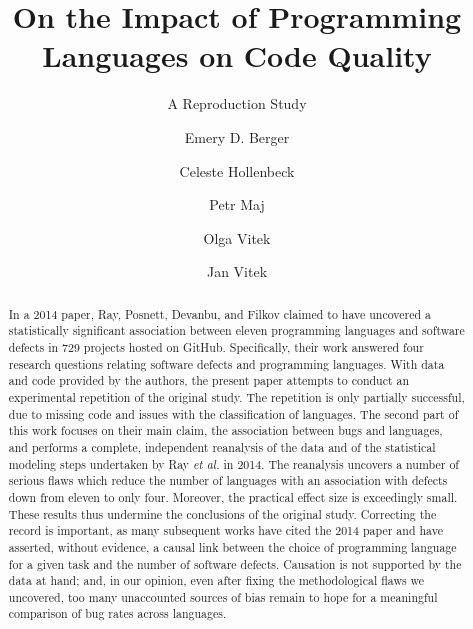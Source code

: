 \documentclass[acmsmall]{acmart}
\newcommand{\gh}{{GitHub}\xspace}
\newcommand{\ea}{\emph{et al.}\xspace}
\begin{document}






\title{On the Impact of Programming Languages on Code Quality}
\subtitle{A Reproduction Study}
  
\author{Emery D. Berger}

\author{Celeste Hollenbeck}

\author{Petr Maj}

\author{Olga Vitek}

\author{Jan Vitek}


\begin{abstract} 
In a 2014 paper, Ray, Posnett, Devanbu, and Filkov claimed to have
uncovered a statistically significant association between eleven programming
languages and software defects in 729 projects hosted on \gh.  Specifically,
their work answered four research questions relating software defects and
programming languages. With data and code provided by the authors, the
present paper attempts to conduct an experimental repetition of the original
study. The repetition is only partially successful, due to missing code and
issues with the classification of languages. The second part of this work
focuses on their main claim, the association between bugs and languages, and
performs a complete, independent reanalysis of the data and of the
statistical modeling steps undertaken by Ray \ea in 2014.  The reanalysis
uncovers a number of serious flaws which reduce the number of languages with
an association with defects down from eleven to only four. Moreover, the
practical effect size is exceedingly small. These results thus undermine the
conclusions of the original study. Correcting the record is important, as
many subsequent works have cited the 2014 paper and have asserted, without
evidence, a causal link between the choice of programming language for a
given task and the number of software defects. Causation is not supported by
the data at hand; and, in our opinion, even after fixing the methodological
flaws we uncovered, too many unaccounted sources of bias remain to hope for
a meaningful comparison of bug rates across languages.
%
\end{abstract}
\maketitle
\end{document}
